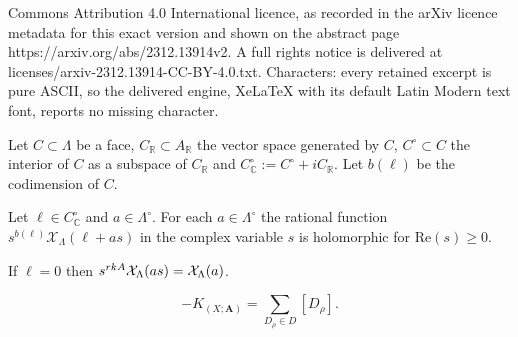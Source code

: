 \documentclass[10pt,a4paper]{amsart}
\newcommand{\C}{\mathbb{C}}
\newcommand{\R}{\mathbb{R}}
\renewcommand{\Re}{\mathrm{Re}}
\begin{document}
Commons Attribution 4.0 International licence, as recorded in the arXiv licence metadata for this exact version and shown on the abstract page https://arxiv.org/abs/2312.13914v2. A full rights notice is delivered at licenses/arxiv-2312.13914-CC-BY-4.0.txt. Characters: every retained excerpt is pure ASCII, so the delivered engine, XeLaTeX with its default Latin Modern text font, reports no missing character.
\begin{lemma}\label{Poles of characteristic functions of cones}
	Let $C \subset \Lambda$ be a face, $C_{\R} \subset A_{\R}$ the vector space generated by $C$, $C^{\circ} \subset C$ the interior of $C$ as a subspace of $C_{\R}$ and $C^{\circ}_{\C} := C^{\circ} + i C_{\R}$. Let $b(\ell)$ be the codimension of $C$.
	
	Let $\ell \in C^{\circ}_{\C}$ and $a \in \Lambda^{\circ}$. For each $a \in \Lambda^{\circ}$ the rational function $s^{b(\ell)} \mathcal{X}_{\Lambda}(\ell + as)$ in the complex variable $s$ is holomorphic for $\Re(s) \geq 0$.
	
	If $\ell = 0$ then $s^{\emph{rk} A} \mathcal{X}_{\Lambda}(as) = \mathcal{X}_{\Lambda}(a)$.
\end{lemma}

\begin{equation}\label{eq:log-canonical divisor}
	-K_{(X; \mathbf{A})} = \sum_{D_{\rho} \in D} [D_{\rho}].
\end{equation}
\end{document}
